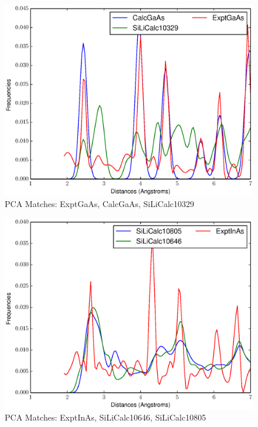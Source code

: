 \documentclass[12pt,letterpaper]{article}
\begin{document}
\begin{figure}[ht]
  \begin{center}
    \includegraphics[scale=0.8]{figs/PC10MatchExptGaAs-CalcGaAs-SiLiCalc10329.eps}
    \caption{PCA Matches: ExptGaAs, CalcGaAs, SiLiCalc10329}
  \end{center}
\end{figure}

\begin{figure}[ht]
  \begin{center}
    \includegraphics[scale=0.8]{figs/PC10MatchExptInAs-SiLiCalc10646-SiLiCalc10805.eps}
    \caption{PCA Matches: ExptInAs, SiLiCalc10646, SiLiCalc10805}
  \end{center}
\end{figure}
\end{document}
